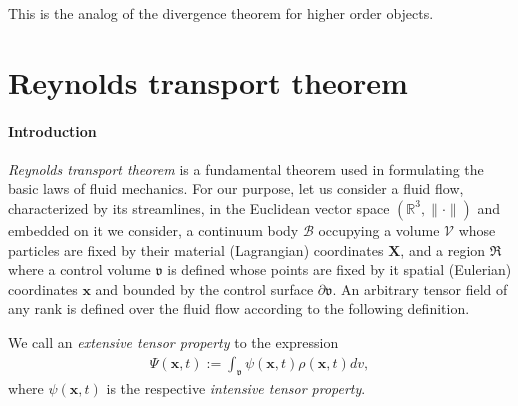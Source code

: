This is the analog of the divergence theorem for higher order
objects.


\section{Reynolds transport theorem}
\label{reynolds-transport}

\paragraph{Introduction}
{\em Reynolds transport theorem} \citep{Reynolds:1903} is a fundamental
theorem used in formulating the basic laws of fluid mechanics. For our
purpose, let us consider a fluid flow, characterized by its
streamlines, in the Euclidean vector space
$(\mathbb{R}^3,\lVert\cdot\rVert)$ and embedded on it we consider, a
continuum body $\mathscr{B}$ occupying a volume $\mathscr{V}$ whose
particles are fixed by their material (Lagrangian) coordinates
$\mathbf{X}$, and a region $\Re$ where a control volume $\mathfrak{v}$
is defined whose points are fixed by it spatial (Eulerian) coordinates
$\mathbf{x}$ and bounded by the control surface
$\partial\mathfrak{v}$. An arbitrary tensor field of any rank is
defined over the fluid flow according to the following definition.
\begin{definition*} We call an {\em extensive tensor property} to the expression
\begin{align}
\Psi(\mathbf{x},t):=
\int_{\mathfrak{v}}\psi(\mathbf{x},t)\rho(\mathbf{x},t)dv,
\end{align}
where $\psi(\mathbf{x},t)$ is the respective {\em intensive tensor property}.
\end{definition*}

